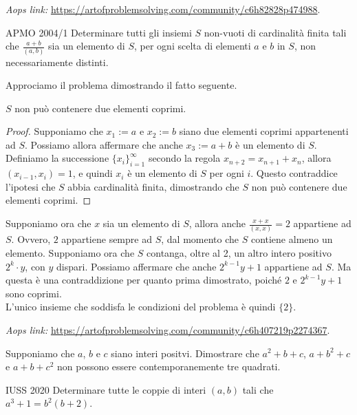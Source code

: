 \documentclass{article}
\begin{document}
\textit{Aops link:}
\href{https://artofproblemsolving.com/community/c6h82828p474988}
{https://artofproblemsolving.com/community/c6h82828p474988}.

\begin{proposition}{APMO 2004/1}{}
	Determinare tutti gli insiemi $S$ non-vuoti di cardinalità finita
	tali che $\frac{a+b}{(a,b)}$ sia un elemento di $S$, per ogni scelta di
	elementi $a$ e $b$ in $S$, non necessariamente distinti.
\end{proposition}

Approciamo il problema dimostrando il fatto seguente.

\begin{claim*}{}{}
	$S$ non può contenere due elementi coprimi.
\end{claim*}
\begin{proof}
	Supponiamo che $x_1:=a$ e $x_2:=b$
	siano due elementi coprimi appartenenti ad $S$.
	Possiamo allora affermare che anche $x_3:=a+b$ è un elemento di $S$.
	Definiamo la successione
	$\{ x_i \}_{i=1}^{\infty}$ secondo la regola $x_{n+2}=x_{n+1}+x_n$,
	allora $(x_{i-1},x_{i})=1$, e quindi $x_i$ è un elemento di $S$
	per ogni $i$. Questo contraddice l'ipotesi che $S$ abbia cardinalità
	finita, dimostrando che $S$ non può contenere due elementi coprimi.
\end{proof}

Supponiamo ora che $x$ sia un elemento di $S$, allora anche
$\frac{x+x}{(x,x)}=2$ appartiene ad $S$. Ovvero, $2$ appartiene
sempre ad $S$, dal momento che $S$ contiene almeno un elemento.
Supponiamo ora che $S$ contanga, oltre al 2, un altro intero positivo
$2^k\cdot y$, con $y$ dispari. Possiamo affermare che anche
$2^{k-1}y+1$ appartiene ad $S$. Ma questa è una contraddizione
per quanto prima dimostrato,
poiché $2$ e $2^{k-1}y+1$ sono coprimi.\\
L'unico insieme che soddisfa le condizioni del problema
è quindi $\{ 2\}$.

\vspace{0.5cm}
\textit{Aops link:}
\href{https://artofproblemsolving.com/community/c6h407219p2274367}
{https://artofproblemsolving.com/community/c6h407219p2274367}.

\begin{proposition}{}{}
	Supponiamo che $a$, $b$ e $c$ siano interi positvi. Dimostrare che
	$a^2+b+c$, $a+b^2+c$ e $a+b+c^2$ non possono essere contemporanemente
	tre quadrati.
\end{proposition}


\begin{proposition}{IUSS 2020}{}
	Determinare tutte le coppie di interi $(a,b)$ tali che $a^3+1=b^2(b+2)$.
\end{proposition}
\end{document}

